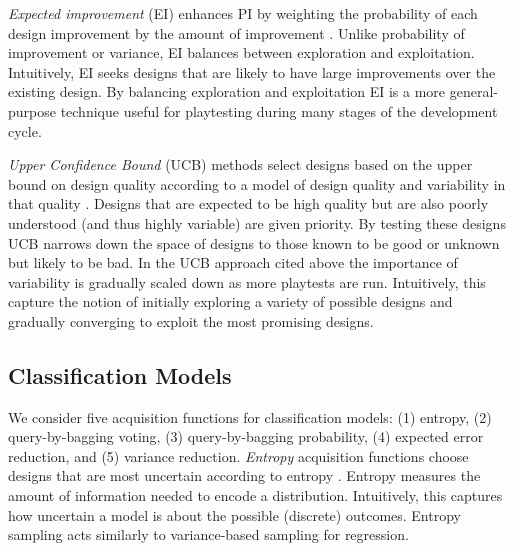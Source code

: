 \documentclass{sig-alternate}
\begin{document}
\textit{Expected improvement} (EI) enhances PI by weighting the probability of each design improvement by the amount of improvement \cite{brochu2010:thesis}.
Unlike probability of improvement or variance, EI balances between exploration and exploitation.
Intuitively, EI seeks designs that are likely to have large improvements over the existing design.
By balancing exploration and exploitation EI is a more general-purpose technique useful for playtesting during many stages of the development cycle.

\textit{Upper Confidence Bound} (UCB) methods select designs based on the upper bound on design quality according to a model of design quality and variability in that quality \cite{srinivas2010:gp-ucb}.
Designs that are expected to be high quality but are also poorly understood (and thus highly variable) are given priority.
By testing these designs UCB narrows down the space of designs to those known to be good or unknown but likely to be bad.
In the UCB approach cited above the importance of variability is gradually scaled down as more playtests are run.
Intuitively, this capture the notion of initially exploring a variety of possible designs and gradually converging to exploit the most promising designs.



\subsection{Classification Models}
We consider five acquisition functions for classification models: (1) entropy, (2) query-by-bagging voting, (3) query-by-bagging probability, (4) expected error reduction, and (5) variance reduction.
\textit{Entropy} acquisition functions choose designs that are most uncertain according to entropy \cite{settles2012:al-book}.
Entropy measures the amount of information needed to encode a distribution.
Intuitively, this captures how uncertain a model is about the possible (discrete) outcomes.
Entropy sampling acts similarly to variance-based sampling for regression.
\end{document}
